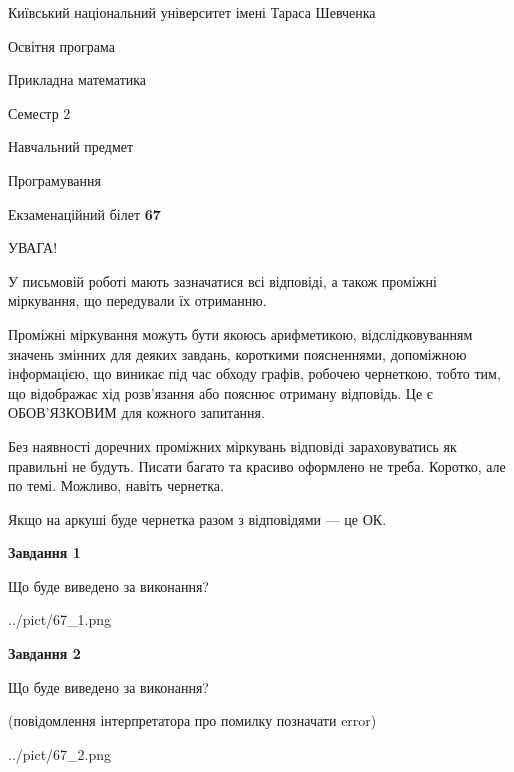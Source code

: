 \documentclass[12pt, ukrainian]{article}
\begin{document}
{{\begin {small}\par
{ \center  Київський національний університет імені Тараса Шевченка \par}
{\parbox {5 cm}{Освітня програма \hfill}{\parbox {7 cm}{Прикладна математика\hfill}}\parbox {6 cm}{\hfill Семестр 2}}\par
{\parbox {5 cm} {Навчальний предмет \hfill}\parbox {7 cm}{Програмування \hfill}\parbox {6cm}{\hfill}\par}\vspace{-7pt} \end{small}}{\center Екзаменаційний білет \No \textbf
{ 67 }\par}}
{
\begin {large}
УВАГА!

У письмовій роботі мають зазначатися всі відповіді, а також проміжні міркування, що передували їх отриманню.

Проміжні міркування можуть бути якоюсь арифметикою, відслідковуванням зна\-чень змінних для деяких завдань,
короткими поясненнями, допоміжною інформацією, що виникає під час обходу графів, робочею чернеткою,
тобто тим, що відображає хід розв’язання або пояснює отриману відповідь.
Це є ОБОВ’ЯЗКОВИМ для кожного запитання.

Без наявності доречних проміжних міркувань відповіді зараховуватись як правиль\-ні не будуть.
Писати багато та красиво оформлено не треба. Коротко, але по темі. Можли\-во, навіть чернетка.

Якщо на аркуші буде чернетка разом з відповідями --- це ОК.

\newpage

{\begin {center}\textbf{Завдання 1}\end {center}}\par
Що буде виведено за виконання?\par
\begin{center}
	{../pict/67_1.png}
\end{center}
\newpage

{\begin {center}\textbf{Завдання 2}\end {center}}\par
Що буде виведено за виконання?\par
 (повідомлення інтерпретатора про помилку позначати error)\par
\begin{center}
	{../pict/67_2.png}
\end{center}
\newpage


\end{large}}
\end{document}
